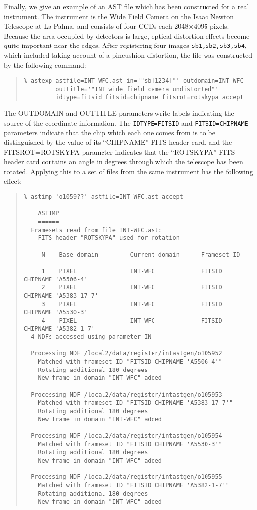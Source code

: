 \documentclass[twoside,11pt]{article}
\newcommand{\latexhtml}[2]{#1}
\renewcommand{\_}{\texttt{\symbol{95}}}
\newcommand{\ttsize}{\latexhtml{\small}{}}
\newenvironment{myquote}{\begin{quote}\ttsize}{\end{quote}}
\begin{document}
Finally, we give an example of an AST file which 
has been constructed for a real 
instrument.  The instrument is the Wide Field Camera on
the Isaac Newton Telescope at La Palma,
and consists of four CCDs each 2048$\times$4096 pixels.
Because the area occupied by detectors is large, 
optical distortion effects become quite important near the edges.
After registering four images {\tt sb1,sb2,sb3,sb4},
which included taking account of a pincushion distortion,
the file was constructed by the following command:
\begin{myquote}
\begin{verbatim}
% astexp astfile=INT-WFC.ast in='"sb[1234]"' outdomain=INT-WFC
         outtitle='"INT wide field camera undistorted"'
         idtype=fitsid fitsid=chipname fitsrot=rotskypa accept
\end{verbatim}
\end{myquote}
The OUTDOMAIN and OUTTITLE parameters write labels indicating 
the source of the coordinate information.
The {\tt IDTYPE=FITSID} and {\tt FITSID=CHIPNAME} parameters 
indicate that the chip which each
one comes from is to be distinguished by the value of its
``CHIPNAME'' FITS header card, and the FITSROT=ROTSKYPA
parameter indicates that the ``ROTSKYPA'' FITS header card
contains an angle in degrees through which the telescope has
been rotated.
Applying this to a set of files from the same instrument has
the following effect:
\begin{myquote}
\begin{verbatim}
% astimp 'o1059??' astfile=INT-WFC.ast accept

    ASTIMP
    ======
  Framesets read from file INT-WFC.ast:
    FITS header "ROTSKYPA" used for rotation

     N    Base domain         Current domain      Frameset ID
     --   -----------         --------------      -----------
     1    PIXEL               INT-WFC             FITSID CHIPNAME 'A5506-4'
     2    PIXEL               INT-WFC             FITSID CHIPNAME 'A5383-17-7'
     3    PIXEL               INT-WFC             FITSID CHIPNAME 'A5530-3'
     4    PIXEL               INT-WFC             FITSID CHIPNAME 'A5382-1-7'
  4 NDFs accessed using parameter IN

  Processing NDF /local2/data/register/intastgen/o105952
    Matched with frameset ID "FITSID CHIPNAME 'A5506-4'"
    Rotating additional 180 degrees
    New frame in domain "INT-WFC" added

  Processing NDF /local2/data/register/intastgen/o105953
    Matched with frameset ID "FITSID CHIPNAME 'A5383-17-7'"
    Rotating additional 180 degrees
    New frame in domain "INT-WFC" added

  Processing NDF /local2/data/register/intastgen/o105954
    Matched with frameset ID "FITSID CHIPNAME 'A5530-3'"
    Rotating additional 180 degrees
    New frame in domain "INT-WFC" added

  Processing NDF /local2/data/register/intastgen/o105955
    Matched with frameset ID "FITSID CHIPNAME 'A5382-1-7'"
    Rotating additional 180 degrees
    New frame in domain "INT-WFC" added
\end{verbatim}
\end{myquote}
\end{document}
